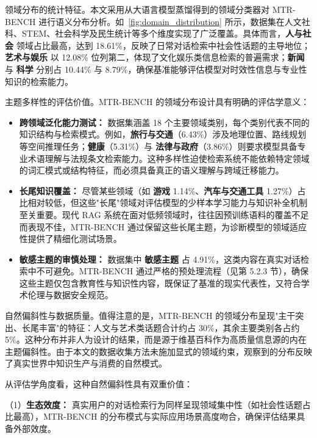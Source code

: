 领域分布的统计特征。本文采用从大语言模型蒸馏得到的领域分类器对 MTR-BENCH 进行语义分布分析。如~\ref{fig:domain_distribution} 所示，数据集在人文社科、STEM、社会科学及民生统计等多个维度实现了广泛覆盖。具体而言，\textbf{人与社会} 领域占比最高，达到 18.61\%，反映了日常对话检索中社会性话题的主导地位；\textbf{艺术与娱乐} 以 12.08\% 位列第二，体现了文化娱乐类信息检索的普遍需求；\textbf{新闻} 与 \textbf{科学} 分别占 10.44\% 与 8.79\%，确保基准能够评估模型对时效性信息与专业性知识的检索能力。



主题多样性的评估价值。MTR-BENCH 的领域分布设计具有明确的评估学意义：
\begin{itemize}
    \item \textbf{跨领域泛化能力测试：} 数据集涵盖 18 个主要领域类别，每个类别代表不同的知识结构与检索模式。例如，\textbf{旅行与交通}（6.43\%）涉及地理位置、路线规划等空间推理任务；\textbf{健康}（5.31\%）与 \textbf{法律与政府}（3.86\%）则要求模型具备专业术语理解与法规条文检索能力。这种多样性迫使检索系统不能依赖特定领域的词汇模式或结构特征，而必须具备真正的语义理解与跨域迁移能力。
    
    \item \textbf{长尾知识覆盖：} 尽管某些领域（如 \textbf{游戏} 1.14\%、\textbf{汽车与交通工具} 1.27\%）占比相对较低，但这些"长尾"领域对评估模型的少样本学习能力与知识补全机制至关重要。现代 RAG 系统在面对低频领域时，往往因预训练语料的覆盖不足而表现不佳，MTR-BENCH 通过保留这些长尾主题，为诊断模型的领域适应性提供了精细化测试场景。
    
    \item \textbf{敏感主题的审慎处理：} 数据集中 \textbf{敏感主题} 占 4.91\%，这类内容在真实对话检索中不可避免。MTR-BENCH 通过严格的预处理流程（见第 5.2.3 节），确保这些主题仅包含教育性与知识性内容，既保证了基准的现实代表性，又符合学术伦理与数据安全规范。
\end{itemize}

自然偏斜性与数据质量。值得注意的是，MTR-BENCH 的领域分布呈现"主干突出、长尾丰富"的特征：人文与艺术类话题合计约占 30\%，其余主要类别各占约 5\%。这种分布并非人为设计的结果，而是源于维基百科作为高质量信息源的内在主题偏斜性。由于本文的数据收集方法未施加显式的领域约束，观察到的分布反映了真实世界中知识生产与消费的自然模式。

从评估学角度看，这种自然偏斜性具有双重价值：

（1）\textbf{生态效度：} 真实用户的对话检索行为同样呈现领域集中性（如社会性话题占比最高），MTR-BENCH 的分布模式与实际应用场景高度吻合，确保评估结果具备外部效度。

